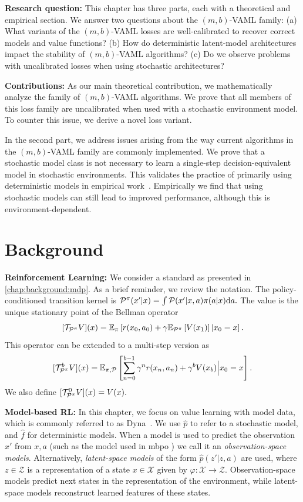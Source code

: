 \textbf{Research question:} This chapter has three parts, each with a theoretical and empirical section. We answer two questions about the $(m,b)$-VAML family: (a) What variants of the $(m,b)$-VAML losses are well-calibrated to recover correct models and value functions? (b) How do deterministic latent-model architectures impact the stability of $(m,b)$-VAML algorithms? (c) Do we observe problems with uncalibrated losses when using stochastic architectures?

\textbf{Contributions:} 
As our main theoretical contribution, we mathematically analyze the family of $(m,b)$-VAML algorithms.
We prove that all members of this loss family are uncalibrated when used with a stochastic environment model.
To counter this issue, we derive a novel loss variant.

In the second part, we address issues arising from the way current algorithms in the $(m,b)$-VAML family are commonly implemented.
We prove that a stochastic model class is not necessary to learn a single-step decision-equivalent model in stochastic environments.
This validates the practice of primarily using deterministic models in empirical work~\parencite{oh2017value,schrittwieser2020mastering,hansen2022temporal}.
Empirically we find that using stochastic models can still lead to improved performance, although this is environment-dependent.


\section{Background}

\textbf{Reinforcement Learning:} We consider a standard as presented in \autoref{chap:background:mdp}.
As a brief reminder, we review the notation.
The policy-conditioned transition kernel is $\P^\pi(x'|x) = \int \P(x'|x,a) \pi(a|x) \mathrm{d} a.$
The value is the unique stationary point of the Bellman operator $$[\mathcal{T}_{\P^\pi} V](x) = \EEX{\pi}{r(x_0,a_0) + \gamma  \EEX{\P^\pi}{V(x_1)}|x_0=x}.$$
This operator can be extended to a multi-step version as $$[{\mathcal{T}}^b_{\P^\pi} V](x) = \EEX{\pi,\P}{\sum_{n=0}^{b-1} \gamma^n r(x_n,a_n) + \gamma^b {V(x_b)}\Big|x_0=x}.$$
We also define $[\mathcal{T}_{\P^\pi}^0 V](x) = V(x).$

\textbf{Model-based RL:} In this chapter, we focus on value learning with model data, which is commonly referred to as Dyna~\parencite{dyna}.
We use $\hat{p}$ to refer to a stochastic model, and $\hat{f}$ for deterministic models.
When a model is used to predict the observation $x'$ from $x,a$ (such as the model used in \ac{mbpo} \parencite{mbpo}) we call it an \emph{observation-space models}.
Alternatively, \emph{latent-space models} of the form $\hat{p}(z'|z, a)$ are used, where $z\in\mathcal{Z}$ is a representation of a state $x\in\mathcal{X}$ given by $\varphi: \mathcal{X} \rightarrow \mathcal{Z}$.
Observation-space models predict next states in the representation of the environment, while latent-space models reconstruct learned features of these states.

